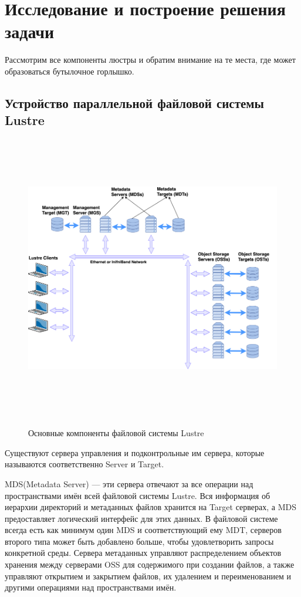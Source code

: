 \section{Исследование и построение решения задачи}
\label{sec:Chapter3} 

Рассмотрим все компоненты люстры и обратим внимание на те места, где может образоваться бутылочное горлышко.

\subsection{Устройство параллельной файловой системы Lustre}

\begin{figure}[h]
\includegraphics[height=12.5cm,keepaspectratio]{./lustre_components.png}\\[0.1cm]
\caption{Основные компоненты файловой системы Lustre}
\label{lustre_components}
\end{figure}

Существуют сервера управления и подконтрольные им сервера, которые называются соответственно Server и Target. 


MDS(Metadata Server) --- эти сервера отвечают за все операции над пространствами имён всей файловой системы Lustre. Вся информация
об иерархии директорий и метаданных файлов хранится на Target серверах, а MDS предоставляет логический интерфейс
для этих данных. В файловой системе всегда есть как минимум один MDS и соответствующий ему MDT, серверов второго 
типа может быть добавлено больше, чтобы удовлетворить запросы конкретной среды. Сервера метаданных управляют
распределением объектов хранения между серверами OSS для содержимого при создании файлов, а также управляют 
открытием и закрытием файлов, их удалением и переименованием и другими операциями над пространствами имён.

